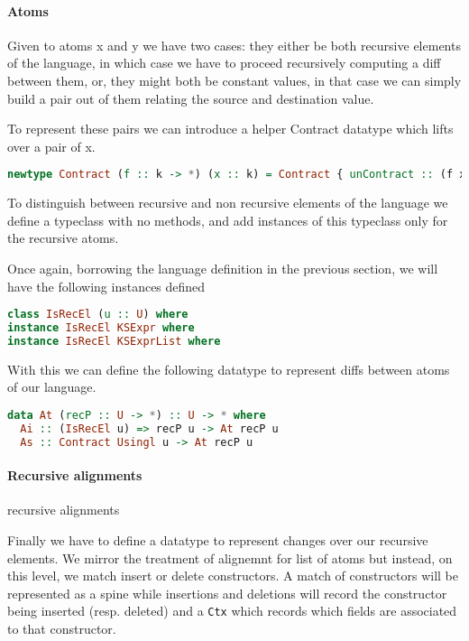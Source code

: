 \documentclass[11pt]{article}
\begin{document}
\paragraph{Atoms}\label{atoms}

Given to atoms x and y we have two cases: they either be both recursive elements 
of the language, in which case we have to proceed recursively computing a diff 
between them, or, they might both be constant values, in that case we can simply 
build a pair out of them relating the source and destination value.

To represent these pairs we can introduce a helper Contract datatype which 
lifts over a pair of x.

\begin{lstlisting}[language=haskell]
  newtype Contract (f :: k -> *) (x :: k) = Contract { unContract :: (f x , f x) }
\end{lstlisting}

To distinguish between recursive and non recursive elements of the language we 
define a typeclass with no methods, and add instances of this typeclass only for the recursive atoms.

Once again, borrowing the language definition in the previous section, we will have the following 
instances defined
\begin{lstlisting}[language=haskell]
  class IsRecEl (u :: U) where
instance IsRecEl KSExpr where
instance IsRecEl KSExprList where
\end{lstlisting}

With this we can define the following datatype to represent diffs between atoms of our language.
\begin{lstlisting}[language=haskell]
data At (recP :: U -> *) :: U -> * where
  Ai :: (IsRecEl u) => recP u -> At recP u
  As :: Contract Usingl u -> At recP u
\end{lstlisting}
\paragraph{Recursive alignments}{recursive alignments}

Finally we have to define a datatype to represent changes over our recursive 
elements. We mirror the treatment of alignemnt for list of atoms but instead, on this level, we 
match insert or delete constructors. 
A match of constructors will be represented as a spine while insertions and 
deletions will record the constructor being inserted (resp. deleted) and a 
\texttt{Ctx} which records which fields are associated to that constructor.
\end{document}
